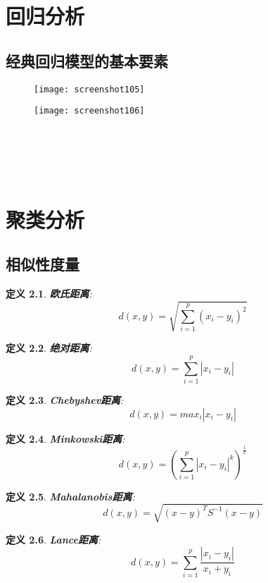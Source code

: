 \documentclass[11pt,a4paper,oneside]{book}
\newtheorem{definition}{定义}
\begin{document}
\chapter{回归分析}
\section{经典回归模型的基本要素}
\begin{figure}[H]
	\centering
	\texttt{[image: screenshot105]}
\end{figure}
\begin{figure}[H]
	\centering
	\texttt{[image: screenshot106]}
\end{figure}
\begin{lstlisting}[language=r]
	
\end{lstlisting}
\begin{lstlisting}[language=r]
	
\end{lstlisting}
\begin{lstlisting}[language=r]
	
\end{lstlisting}
\chapter{聚类分析}
\section{相似性度量}
\begin{definition}
\textbf{欧氏距离}:\[d(x,y)=\sqrt{\sum_{i=1}^{p}(x_i-y_i)^2}\]
\end{definition}
\begin{definition}
	\textbf{绝对距离}:\[d(x,y)=\sum_{i=1}^{p}|x_i-y_i|\]
\end{definition}
\begin{definition}
	\textbf{Chebyshev距离}:\[d(x,y)=max_i|x_i-y_i|\]
\end{definition}
\begin{definition}
	\textbf{Minkowski距离}:\[d(x,y)=(\sum_{i=1}^{p}|x_i-y_i|^k)^{\frac{1}{k}}\]
\end{definition}
\begin{definition}
	\textbf{Mahalanobis距离}:\[d(x,y)=\sqrt{(x-y)^TS^{-1}(x-y)}\]
\end{definition}
\begin{definition}
	\textbf{Lance距离}:\[d(x,y)=\sum_{i=1}^{p}\frac{|x_i-y_i|}{x_i+y_i}\]
\end{definition}
\end{document}
